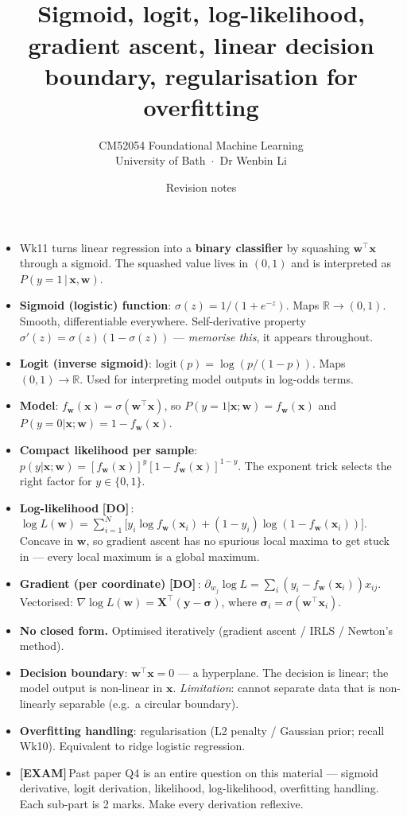 \documentclass[11pt, a4paper]{article}
\title{\vspace{-1cm}{\Huge\bfseries Week 11 — Logistic Regression} \\[0.4em]{\large Sigmoid, logit, log-likelihood, gradient ascent, linear decision boundary, regularisation for overfitting}}
\author{\large CM52054 Foundational Machine Learning \\[0.2em]\normalsize University of Bath \,$\cdot$\, Dr Wenbin Li}
\date{Revision notes}
\newcommand{\examflag}{\textcolor{tipBd}{\textbf{[EXAM]}}\,}
\newcommand{\doflag}{\textcolor{defBd}{\textbf{[DO]}}\,}
\begin{document}
\maketitle\thispagestyle{empty}\vspace{1em}

\begin{tldrbox}
\begin{itemize}[leftmargin=*]
  \item Wk11 turns linear regression into a \textbf{binary classifier} by squashing $\mathbf{w}^\top\mathbf{x}$ through a sigmoid. The squashed value lives in $(0,1)$ and is interpreted as $P(y=1\,|\,\mathbf{x},\mathbf{w})$.
  \item \textbf{Sigmoid (logistic) function}: $\sigma(z) = 1/(1+e^{-z})$. Maps $\mathbb{R}\to(0,1)$. Smooth, differentiable everywhere. Self-derivative property $\sigma'(z) = \sigma(z)(1-\sigma(z))$ — \emph{memorise this}, it appears throughout.
  \item \textbf{Logit (inverse sigmoid)}: $\mathrm{logit}(p) = \log(p/(1-p))$. Maps $(0,1)\to\mathbb{R}$. Used for interpreting model outputs in log-odds terms.
  \item \textbf{Model}: $f_\mathbf{w}(\mathbf{x}) = \sigma(\mathbf{w}^\top\mathbf{x})$, so $P(y=1|\mathbf{x};\mathbf{w}) = f_\mathbf{w}(\mathbf{x})$ and $P(y=0|\mathbf{x};\mathbf{w}) = 1 - f_\mathbf{w}(\mathbf{x})$.
  \item \textbf{Compact likelihood per sample}: $p(y|\mathbf{x};\mathbf{w}) = [f_\mathbf{w}(\mathbf{x})]^y[1-f_\mathbf{w}(\mathbf{x})]^{1-y}$. The exponent trick selects the right factor for $y\in\{0,1\}$.
  \item \textbf{Log-likelihood} \doflag{}: $\log L(\mathbf{w}) = \sum_{i=1}^N \big[y_i\log f_\mathbf{w}(\mathbf{x}_i) + (1-y_i)\log(1-f_\mathbf{w}(\mathbf{x}_i))\big]$. Concave in $\mathbf{w}$, so gradient ascent has no spurious local maxima to get stuck in --- every local maximum is a global maximum.
  \item \textbf{Gradient (per coordinate)} \doflag{}: $\partial_{w_j}\log L = \sum_i (y_i - f_\mathbf{w}(\mathbf{x}_i))x_{ij}$. Vectorised: $\nabla\log L(\mathbf{w}) = \mathbf{X}^\top(\mathbf{y} - \boldsymbol\sigma)$, where $\boldsymbol\sigma_i = \sigma(\mathbf{w}^\top\mathbf{x}_i)$.
  \item \textbf{No closed form.} Optimised iteratively (gradient ascent / IRLS / Newton's method).
  \item \textbf{Decision boundary}: $\mathbf{w}^\top\mathbf{x} = 0$ — a hyperplane. The decision is linear; the model output is non-linear in $\mathbf{x}$. \emph{Limitation}: cannot separate data that is non-linearly separable (e.g.\ a circular boundary).
  \item \textbf{Overfitting handling}: regularisation (L2 penalty / Gaussian prior; recall Wk10). Equivalent to ridge logistic regression.
  \item \examflag{}Past paper Q4 is an entire question on this material — sigmoid derivative, logit derivation, likelihood, log-likelihood, overfitting handling. Each sub-part is 2 marks. Make every derivation reflexive.
\end{itemize}
\end{tldrbox}
\end{document}

